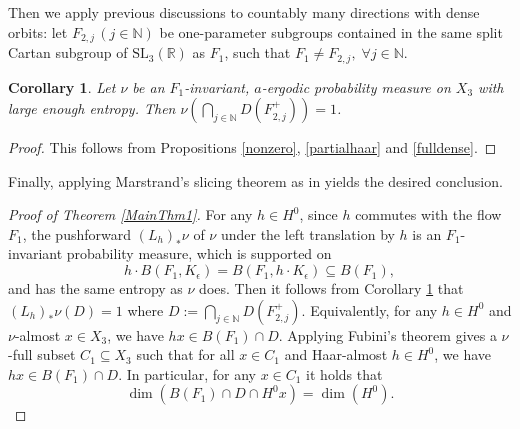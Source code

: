\documentclass[reqno,12pt]{amsart}
\newtheorem{corollary}[theorem]{Corollary}
\theoremstyle{definition}
\numberwithin{equation}{section}
\newcommand{\RR}{\mathbb{R}}
\newcommand{\NN}{\mathbb{N}}
\newcommand{\SL}{\mathrm{SL}}
\begin{document}
{Then we apply previous discussions to countably many directions with dense orbits: let $F_{2,j}\,(j\in\NN)$ be one-parameter subgroups contained in the same split Cartan subgroup of $\SL_3(\RR)$ as $F_1$, such that $F_1\neq F_{2,j},\;\forall j\in\NN$. 

\begin{corollary}\label{countfulldense}
    Let $\nu$ be an $F_1$-invariant, $a$-ergodic probability measure on $X_3$ with large enough entropy. Then $\nu\left(\bigcap_{j\in\NN}D(F^+_{2,j})\right)=1$.
\end{corollary}
\begin{proof}
    This follows from Propositions \ref{nonzero}, \ref{partialhaar} and \ref{fulldense}.
\end{proof}

Finally, applying  Marstrand's slicing theorem as in \cite[Section 4]{bet15}  yields the desired conclusion.

\begin{proof}[Proof of Theorem \ref{MainThm1}]
For any $h\in H^0$, since $h$ commutes with the flow $F_1$, the pushforward $(L_h)_*\nu$ of $\nu$ under the left translation by $h$ is an $F_1$-invariant probability measure, which is supported on $$h\cdot B(F_1,K_\epsilon)=B(F_1,h\cdot K_\epsilon)\subseteq B(F_1),$$ and has the same entropy as $\nu$ does. Then it follows from Corollary \ref{countfulldense} that $(L_h)_*\nu(D)=1$ where $D:=\bigcap_{j\in\NN}D(F_{2,j}^+)$. Equivalently, for any $h\in H^0$ and $\nu$-almost $x\in X_3$, we have $hx\in B(F_1)\cap D$. Applying Fubini's theorem gives a $\nu$-full subset $C_1\subseteq X_3$ such that for all $x\in C_1$ and Haar-almost $h\in H^0$, we have $hx\in B(F_1)\cap D$. In particular, for any $x\in C_1$ %
it holds that
$$
\dim(B(F_1)\cap D\cap H^0x)=\dim(H^0).
$$


\end{proof}}
\end{document}
